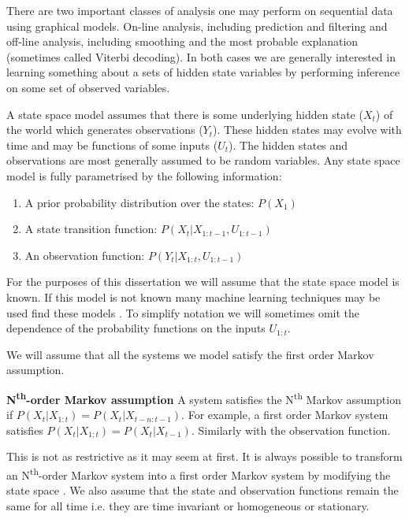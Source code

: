 \documentclass[../masters.tex]{subfiles}
\begin{document}
There are two important classes of analysis one may perform on sequential data using graphical models. On-line analysis, including prediction and filtering and off-line analysis, including smoothing and the most probable explanation (sometimes called Viterbi decoding). In both cases we are generally interested in learning something about a sets of hidden state variables by performing inference on some set of observed variables. 

A state space model assumes that there is some underlying hidden state ($X_t$) of the world which generates observations ($Y_t$). These hidden states may evolve with time and may be functions of some inputs ($U_t$). The hidden states and observations are most generally assumed to be random variables. Any state space model is fully parametrised by the following information:
\begin{enumerate}
\item
A prior probability distribution over the states: $P(X_1)$
\item
A state transition function: $P(X_t|X_{1:t-1}, U_{1:t-1})$
\item
An observation function: $P(Y_t|X_{1:t}, U_{1:t-1})$
\end{enumerate} 
For the purposes of this dissertation we will assume that the state space model is known. If this model is not known many machine learning techniques may be used find these models \cite{murphy1}. To simplify notation we will sometimes omit the dependence of the probability functions on the inputs $U_{1:t}$.

We will assume that all the systems we model satisfy the first order Markov assumption.
\begin{defn}
\textbf{N\textsuperscript{th}-order Markov assumption} A system satisfies the N\textsuperscript{th} Markov assumption if $P(X_t|X_{1:t})=P(X_t|X_{t-n:t-1})$. For example, a first order Markov system satisfies  $P(X_t|X_{1:t})=P(X_t|X_{t-1})$. Similarly with the observation function.
\end{defn}
This is not as restrictive as it may seem at first. It is always possible to transform an N\textsuperscript{th}-order Markov system into a first order Markov system by modifying the state space \cite{murphy1}. We also assume that the state and observation functions remain the same for all time i.e. they are time invariant or homogeneous or stationary.
\end{document}
